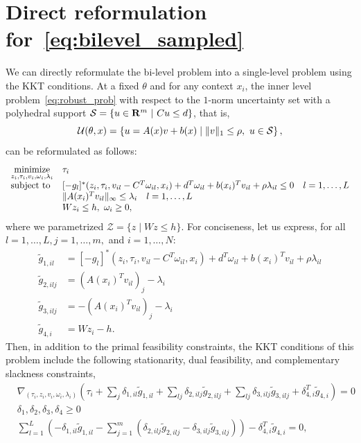 \section{Direct reformulation for~\eqref{eq:bilevel_sampled}}
\label{appx:bilinear}
We can directly reformulate the bi-level problem into a single-level problem using the KKT conditions. 
At a fixed $\theta$ and for any context $x_i$, the inner level problem~\eqref{eq:robust_prob} with respect to the $1$-norm uncertainty set with a polyhedral support $\mathcal{S}=\{u \in {\mathbf R}^m~|~Cu \leq d \}$, that is, 
\begin{equation*}
\label{unc_set}
    {\mathcal{U}}(\theta,x) = \left\{u = A(x)v+b(x) \mid \|v\|_1 \leq \rho ,~ u \in \mathcal{S}\right\},
\end{equation*} 
can be reformulated as follows:
\begin{equation*}
	\label{eq:single}
  \begin{array}[t]{ll}
		\underset{z_i,\tau_i,v_i,\omega_i,\lambda_i}{\mbox{minimize}} & \tau_i \\
		\mbox{subject to} &[-g_l]^*(z_i,\tau_i,v_{il}-C^T\omega_{il},x_i) + 
        d^T\omega_{il} + b(x_i)^Tv_{il} + \rho\lambda_{il} \leq 0 \quad l = 1,\dots,L \\
         & \|A(x_i)^Tv_{il}\|_\infty \leq \lambda_{i} \quad l = 1,\dots,L\\
        & Wz_i \leq h,~\omega_i \geq 0,\\
	\end{array}
\end{equation*}
where we parametrized $\mathcal{Z} = \{z\mid Wz\leq h\}$. For conciseness, let us express, for all $l=1,\dots,L, j=1,\dots,m,$ and $i=1,\dots,N$:
\begin{align*}
    \tilde{g}_{1,il} &= [-g_l]^*(z_i,\tau_i,v_{il}-C^T\omega_{il},x_i) + 
        d^T\omega_{il} + b(x_i)^Tv_{il} + \rho\lambda_{il} \\
        \tilde{g}_{2,ilj} &= (A(x_i)^Tv_{il})_j - \lambda_i\\
        \tilde{g}_{3,ilj} &= -(A(x_i)^Tv_{il})_j - \lambda_i\\
        \tilde{g}_{4,i} &= Wz_i - h.
\end{align*}
Then, in addition to the primal feasibility constraints, the KKT conditions of this problem include the following stationarity, dual feasibility, and complementary slackness constraints,
\begin{equation}
	\label{eq:KKT}
	\tag{KKT}
\begin{aligned}
&\nabla_{(\tau_i,z_i,v_i,\omega_i,\lambda_i)} \left(\tau_i + \sum_{j}\delta_{1,il}\tilde{g}_{1,il} + \sum_{lj}\delta_{2,ilj}\tilde{g}_{2,ilj}+ \sum_{lj}\delta_{3,ilj}\tilde{g}_{3,ilj} + \delta_{4,i}^T\tilde{g}_{4,i}\right) = 0\\
&\delta_1,\delta_2,\delta_3,\delta_4 \geq 0\\
& \sum_{l=1}^{L} \left (-\delta_{1,il}\tilde{g}_{1,il} -\sum_{j=1}^{m} (\delta_{2,ilj}\tilde{g}_{2,ilj} -\delta_{3,ilj}\tilde{g}_{3,ilj})\right ) -\delta_{4,i}^T\tilde{g}_{4,i} = 0,
\end{aligned}
\end{equation}
